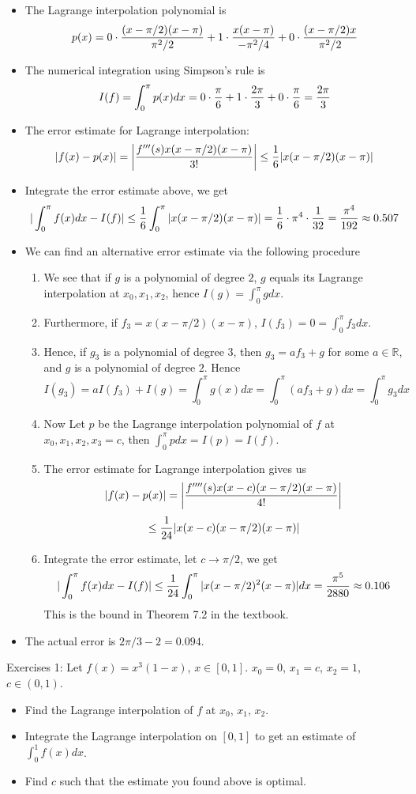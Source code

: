 \documentclass{article} %
\theoremstyle{break}
\begin{document}
      \begin{itemize}
      \item The Lagrange interpolation polynomial is
        \[p(x)=0\cdot {(x-\pi/2)(x-\pi)\over \pi^2/2}+1\cdot {x(x-\pi)\over -\pi^2/4}+0\cdot {(x-\pi/2)x\over \pi^2/2}\]
      \item The numerical integration using Simpson's rule is
        \[I(f)=\int_0^\pi p(x)dx=0\cdot {\pi\over 6}+1\cdot {2\pi\over 3}+0\cdot {\pi\over 6}={2\pi\over 3}\]
      \item The error estimate for Lagrange interpolation:
        \[|f(x)-p(x)|=\left|{f'''(s)x(x-{\pi/2})(x-\pi)\over 3!}\right|\leq {1\over 6}|x(x-\pi/2)(x-\pi)|\]
      \item Integrate the error estimate above, we get
        \[|\int_0^\pi f(x)dx-I(f)|\leq {1\over 6}\int_0^\pi|x(x-\pi/2)(x-\pi)|={1\over 6}\cdot \pi^4 \cdot{1\over 32}={\pi^4\over 192}\approx 0.507\]
      \item We can find an alternative error estimate via the following procedure
        \begin{enumerate}
         \item We see that if $g$ is a polynomial of degree $2$, $g$ equals its Lagrange interpolation at $x_0, x_1, x_2$, hence $I(g)=\int_0^\pi gdx$.
         \item Furthermore, if $f_3=x(x-\pi/2)(x-\pi)$, $I(f_3)=0=\int_0^\pi f_3dx$.
         \item Hence, if $g_3$ is a polynomial of degree 3, then $g_3=af_3+g$ for some $a\in\mathbb{R}$, and $g$ is a polynomial of degree $2$. Hence
           \[I(g_3)=aI(f_3)+I(g)=\int_0^\pi g(x)dx=\int_0^\pi (af_3+g)dx=\int_0^\pi g_3dx\]
         \item Now Let $p$ be the Lagrange interpolation polynomial of $f$ at $x_0, x_1, x_2, x_3=c$, then $\int_0^\pi pdx=I(p)=I(f)$.
         \item The error estimate for Lagrange interpolation gives us
           \[|f(x)-p(x)|=\left|{f''''(s)x(x-c)(x-{\pi/2})(x-\pi)\over 4!}\right|\]
           \[\leq {1\over 24}|x(x-c)(x-\pi/2)(x-\pi)|\]
         \item Integrate the error estimate, let $c\rightarrow {\pi/2}$, we get
           \[|\int_0^\pi f(x)dx-I(f)|\leq {1\over 24}\int_0^\pi |x(x-\pi/2)^2(x-\pi)| dx={\pi^5\over 2880}\approx 0.106\]
           This is the bound in Theorem 7.2 in the textbook.
         \end{enumerate}
       \item The actual error is $2\pi/3-2=0.094$.
      \end{itemize}
      Exercises 1: Let $f(x)=x^3(1-x)$, $x\in [0, 1]$. $x_0=0$, $x_1=c$, $x_2=1$, $c\in (0, 1)$.
      \begin{itemize}
      \item Find the Lagrange interpolation of $f$ at $x_0$, $x_1$, $x_2$.
      \item Integrate the Lagrange interpolation on $[0, 1]$ to get an estimate of $\int_0^1f(x)dx$. 
      \item Find $c$ such that the estimate you found above is optimal.
      \end{itemize}
      
\end{document}

